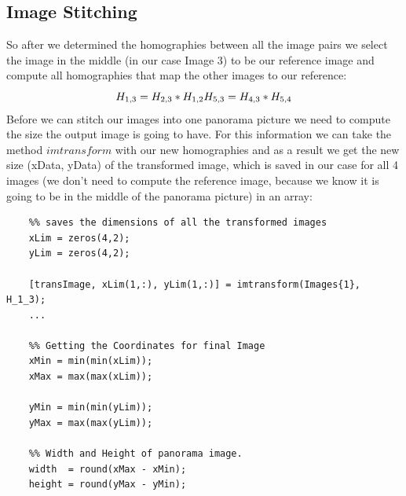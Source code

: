\documentclass[subfigure,epsfig,fleqn,float,numbers=noenddot]{scrartcl}
\begin{document}
\subsection{Image Stitching}
\label{sec:C}
So after we determined the homographies between all the image pairs we select the image in the middle (in our case Image 3) to be our reference image and compute all homographies that map the other images to our reference:
\begin{equation*}
\\H_{1,3} = H_{2,3} * H_{1,2} \\
H_{5,3} = H_{4,3} * H_{5,4} 
\end{equation*}
Before we can stitch our images into one panorama picture we need to compute the size the output image is going to have. For this information we can take the method $imtransform$ with our new homographies and as a result we get the new size (xData, yData) of the transformed image, which is saved in our case for all 4 images (we don't need to compute the reference image, because we know it is going to be in the middle of the panorama picture) in an array: 
\begin{lstlisting}
	%% saves the dimensions of all the transformed images
	xLim = zeros(4,2);
	yLim = zeros(4,2);
	
	[transImage, xLim(1,:), yLim(1,:)] = imtransform(Images{1}, H_1_3);
	...
	
	%% Getting the Coordinates for final Image
	xMin = min(min(xLim));
	xMax = max(max(xLim));
    
	yMin = min(min(yLim));
	yMax = max(max(yLim));
    
	%% Width and Height of panorama image.
	width  = round(xMax - xMin);	
	height = round(yMax - yMin);
\end{lstlisting}
\end{document}
